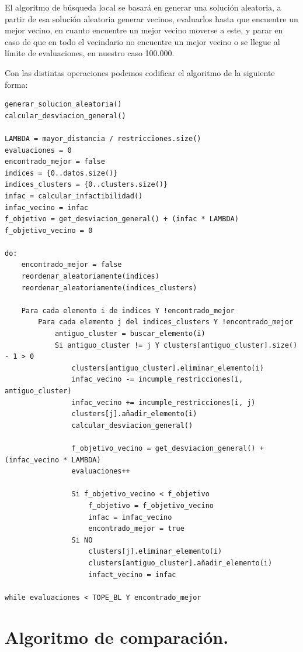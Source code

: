 \documentclass[12pt, spanish]{article}
\begin{document}
El algoritmo de búsqueda local se basará en generar una solución aleatoria, a partir de esa solución aleatoria generar vecinos, evaluarlos hasta que encuentre un mejor vecino, en cuanto encuentre un mejor vecino moverse a este, y parar en caso de que en todo el vecindario no encuentre un mejor vecino o se llegue al límite de evaluaciones, en nuestro caso 100.000.

\newpage

Con las distintas operaciones podemos codificar el algoritmo de la siguiente forma:

{\small
\begin{lstlisting}
generar_solucion_aleatoria()
calcular_desviacion_general()

LAMBDA = mayor_distancia / restricciones.size()
evaluaciones = 0
encontrado_mejor = false
indices = {0..datos.size()}
indices_clusters = {0..clusters.size()}
infac = calcular_infactibilidad()
infac_vecino = infac
f_objetivo = get_desviacion_general() + (infac * LAMBDA)
f_objetivo_vecino = 0

do:
	encontrado_mejor = false
	reordenar_aleatoriamente(indices)
	reordenar_aleatoriamente(indices_clusters)
	
	Para cada elemento i de indices Y !encontrado_mejor
		Para cada elemento j del indices_clusters Y !encontrado_mejor
			antiguo_cluster = buscar_elemento(i)
			Si antiguo_cluster != j Y clusters[antiguo_cluster].size() - 1 > 0
				clusters[antiguo_cluster].eliminar_elemento(i)
				infac_vecino -= incumple_restricciones(i, antiguo_cluster)
				infac_vecino += incumple_restricciones(i, j)
				clusters[j].añadir_elemento(i)
				calcular_desviacion_general()
				
				f_objetivo_vecino = get_desviacion_general() + (infac_vecino * LAMBDA)
				evaluaciones++				
				
				Si f_objetivo_vecino < f_objetivo
					f_objetivo = f_objetivo_vecino
					infac = infac_vecino
					encontrado_mejor = true
				Si NO
					clusters[j].eliminar_elemento(i)
					clusters[antiguo_cluster].añadir_elemento(i)
					infact_vecino = infac

while evaluaciones < TOPE_BL Y encontrado_mejor

 \end{lstlisting}
 }

\section{Algoritmo de comparación.}
\end{document}
